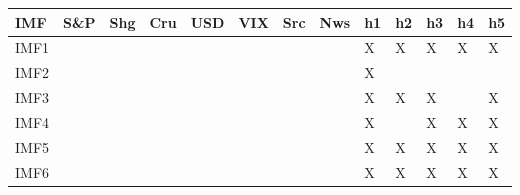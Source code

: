 {\tiny\setlength{\tabcolsep}{1pt}\begin{tabular}{lllllllllllll} \toprule
IMF & S\&P & Shg & Cru & USD & VIX & Src & Nws & h1 & h2 & h3 & h4 & h5 \\ \midrule
IMF1 & & & & & & & & X & X & X & X & X \\ 
IMF2 & & & & & & & & X & & & & \\ 
IMF3 & & & & & & & & X & X & X & & X \\ 
IMF4 & & & & & & & & X & & X & X & X \\ 
IMF5 & & & & & & & & X & X & X & X & X \\ 
IMF6 & & & & & & & & X & X & X & X & X \\ 
\bottomrule \end{tabular}}